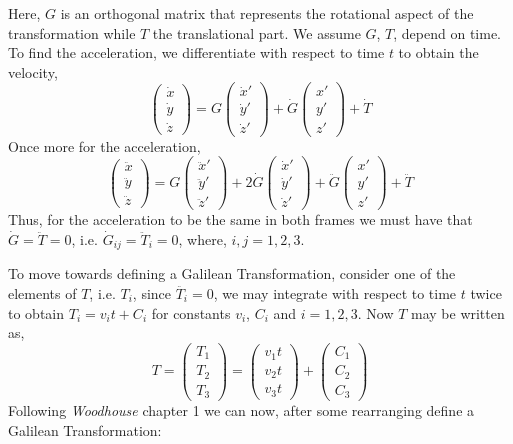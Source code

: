 \documentclass[a4paper,12pt,draft]{report}
\begin{document}
Here, $G$ is an orthogonal matrix that represents the rotational aspect of the transformation while $T$ the translational part. We assume $G$, $T$, depend on time. To find the acceleration, we differentiate with respect to time $t$ to obtain the velocity,
$$
\begin{pmatrix}\dot{x}\\\dot{y}\\\dot{z}\end{pmatrix} = G\begin{pmatrix}\dot{x}'\\\dot{y}'\\\dot{z}'\end{pmatrix} + \dot{G}\begin{pmatrix}x'\\y'\\z'\end{pmatrix} + \dot{T}
$$
Once more for the acceleration,
$$
\begin{pmatrix}\ddot{x}\\\ddot{y}\\\ddot{z}\end{pmatrix} = G\begin{pmatrix}\ddot{x}'\\\ddot{y}'\\\ddot{z}'\end{pmatrix} + 2\dot{G}\begin{pmatrix}\dot{x}'\\\dot{y}'\\\dot{z}'\end{pmatrix} + \ddot{G}\begin{pmatrix}x'\\y'\\z'\end{pmatrix} + \ddot{T}
$$
Thus, for the acceleration to be the same in both frames we must have that $\dot{G} = \ddot{T} = 0$, i.e. $\dot{G}_{ij} = \ddot{T}_i = 0$, where, $i, j = 1, 2, 3$.

To move towards defining a Galilean Transformation, consider one of the elements of $T$, i.e. $T_i$, since $\ddot{T_i} = 0$, we may integrate with respect to time $t$ twice to obtain $T_i = v_it + C_i$ for constants $v_i$, $C_i$ and $i = 1, 2, 3$. Now $T$ may be written as,
$$
T = \begin{pmatrix}T_1\\T_2\\T_3\end{pmatrix} = \begin{pmatrix}v_1t\\v_2t\\v_3t\end{pmatrix} + \begin{pmatrix}C_1\\C_2\\C_3\end{pmatrix}
$$
Following \emph{Woodhouse} \cite{NMJW} chapter 1 we can now, after some rearranging define a Galilean Transformation:
\end{document}
